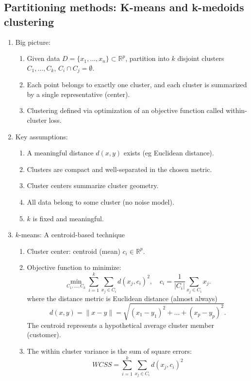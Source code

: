 \documentclass{article}
\begin{document}
\subsection*{Partitioning methods: K-means and k-medoids clustering}

\begin{enumerate}

\item Big picture:
\begin{enumerate}
\item Given data $D = \{x_1,\dots,x_n\} \subset \mathbb{R}^p$, partition into $k$ disjoint clusters $C_1,\dots,C_k$, $C_i \cap C_j = \emptyset$.
\item Each point belongs to exactly one cluster, and each cluster is summarized by a single representative (center).
\item Clustering defined via optimization of an objective function called within-cluster loss.
\end{enumerate}

\item Key assumptions:
\begin{enumerate}
\item A meaningful distance $d(x,y)$ exists (eg Euclidean distance).
\item Clusters are compact and well-separated in the chosen metric.
\item Cluster centers summarize cluster geometry.
\item All data belong to some cluster (no noise model).
\item $k$ is fixed and meaningful.
\end{enumerate}

\item $k$-means: A centroid-based technique
\begin{enumerate}
\item Cluster center: centroid (mean) $c_i \in \mathbb{R}^p$.

\item Objective function to minimize:
\[
\min_{C_1,\dots,C_k} \sum_{i=1}^k \sum_{x_j \in C_i} d(x_j , c_i)^2,
\quad
c_i = \frac{1}{|C_i|}\sum_{x_j \in C_i} x_j.
\]
where the distance metric is Euclidean distance (almost always)
\[
d(x,y) = \|x-y\| = \sqrt{(x_1-y_1)^2 + \dots + (x_p-y_p)^2}.
\]
The centroid represents a hypothetical average cluster member (customer).
\item The within cluster variance is the sum of square errors:
\[
WCSS = \sum_{i=1}^k \sum_{x_j \in C_i} d(x_j , c_i)^2
\]


\end{enumerate}
\end{enumerate}
\end{document}
